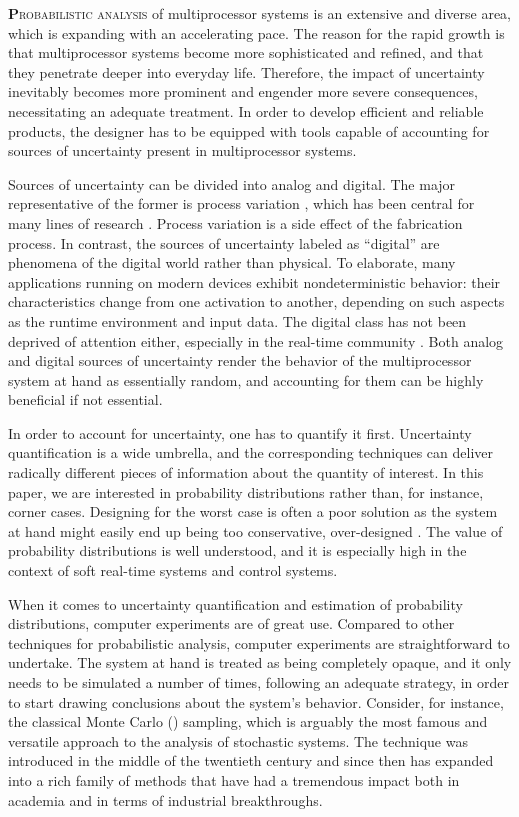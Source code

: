 \lettrine[findent=0.4em, nindent=0em]{\textbf{P}}{robabilistic analysis} of
multiprocessor systems is an extensive and diverse area, which is expanding with
an accelerating pace. The reason for the rapid growth is that multiprocessor
systems become more sophisticated and refined, and that they penetrate deeper
into everyday life. Therefore, the impact of uncertainty inevitably becomes more
prominent and engender more severe consequences, necessitating an adequate
treatment. In order to develop efficient and reliable products, the designer has
to be equipped with tools capable of accounting for sources of uncertainty
present in multiprocessor systems.

Sources of uncertainty can be divided into analog and digital. The major
representative of the former is process variation \cite{srivastava2005}, which
has been central for many lines of research \cite{bhardwaj2008, juan2012,
lee2013, ukhov2014, ukhov2015}. Process variation is a side effect of the
fabrication process. In contrast, the sources of uncertainty labeled as
``digital'' are phenomena of the digital world rather than physical. To
elaborate, many applications running on modern devices exhibit nondeterministic
behavior: their characteristics change from one activation to another, depending
on such aspects as the runtime environment and input data. The digital class has
not been deprived of attention either, especially in the real-time community
\cite{diaz2002, santinelli2011, quinton2012, yang2013, tanasa2015}. Both analog
and digital sources of uncertainty render the behavior of the multiprocessor
system at hand as essentially random, and accounting for them can be highly
beneficial if not essential.

In order to account for uncertainty, one has to quantify it first. Uncertainty
quantification is a wide umbrella, and the corresponding techniques can deliver
radically different pieces of information about the quantity of interest. In
this paper, we are interested in probability distributions rather than, for
instance, corner cases. Designing for the worst case is often a poor solution as
the system at hand might easily end up being too conservative, over-designed
\cite{quinton2012}. The value of probability distributions is well understood,
and it is especially high in the context of soft real-time systems and control
systems.

When it comes to uncertainty quantification and estimation of probability
distributions, computer experiments \cite{santner2003} are of great use.
Compared to other techniques for probabilistic analysis, computer experiments
are straightforward to undertake. The system at hand is treated as being
completely opaque, and it only needs to be simulated a number of times,
following an adequate strategy, in order to start drawing conclusions about the
system's behavior. Consider, for instance, the classical Monte Carlo ()
sampling, which is arguably the most famous and versatile approach to the
analysis of stochastic systems. The technique was introduced in the middle of
the twentieth century and since then has expanded into a rich family of methods
that have had a tremendous impact both in academia and in terms of industrial
breakthroughs.

